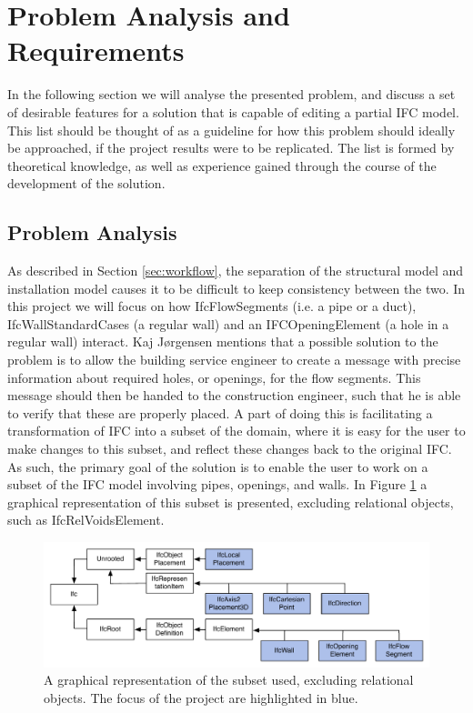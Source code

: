 \section{Problem Analysis and Requirements}
In the following section we will analyse the presented problem, and discuss a set of desirable features for a solution that is capable of editing a partial IFC model. This list should be thought of as a guideline for how this problem should ideally be approached, if the project results were to be replicated. The list is formed by theoretical knowledge, as well as experience gained through the course of the development of the solution.

\subsection{Problem Analysis}
\label{problem_analysis}
As described in Section \ref{sec:workflow}, the separation of the structural model and installation model causes it to be difficult to keep consistency between the two. In this project we will focus on how IfcFlowSegments (i.e. a pipe or a duct), IfcWallStandardCases (a regular wall) and an IFCOpeningElement (a hole in a regular wall) interact. Kaj Jørgensen mentions that a possible solution to the problem is to allow the building service engineer to create a message with precise information about required holes, or openings, for the flow segments. This message should then be handed to the construction engineer, such that he is able to verify that these are properly placed. A part of doing this is facilitating a transformation of IFC into a subset of the domain, where it is easy for the user to make changes to this subset, and reflect these changes back to the original IFC. As such, the primary goal of the solution is to enable the user to work on a subset of the IFC model involving pipes, openings, and walls. In Figure \ref{fig:ifcheirachy} a graphical representation of this subset is presented, excluding relational objects, such as IfcRelVoidsElement.

\begin{figure}[t]
    \centering
        \includegraphics[width=120mm]{images/IfcHeirachy.pdf}
    \caption{A graphical representation of the subset used, excluding relational objects. The focus of the project are highlighted in blue.}
    \label{fig:ifcheirachy}
\end{figure}

